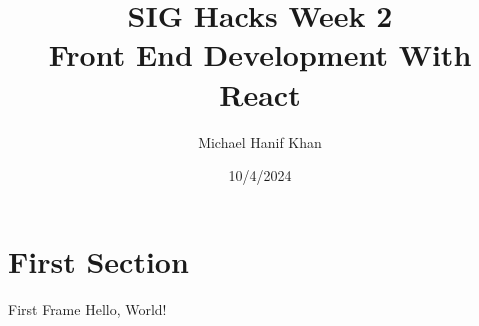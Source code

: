 \documentclass{beamer}
\title{SIG Hacks Week 2 \\
Front End Development With React}
\date{10/4/2024}
\author{Michael Hanif Khan}
\institute{The Association for Computing Machinery @ UIC}
\begin{document}
	\maketitle
	\section{First Section}
	\begin{frame}{First Frame}
		Hello, World!
	\end{frame}
\end{document}
